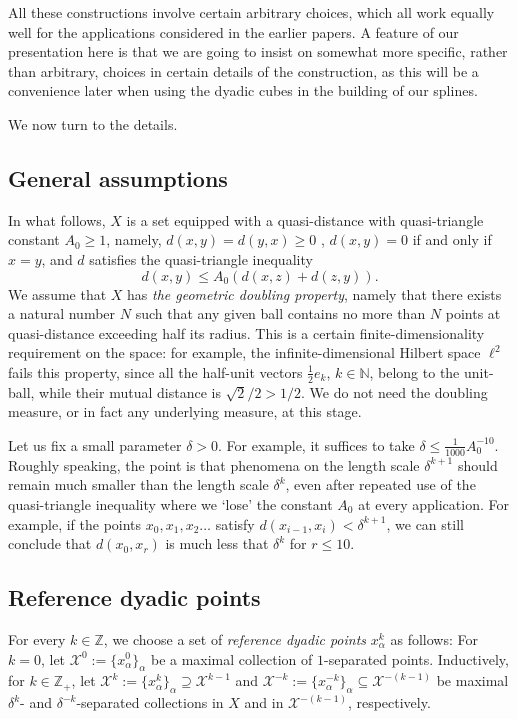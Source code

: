 \documentclass{amsart}
\numberwithin{equation}{section}
\theoremstyle{plain}
\theoremstyle{definition}
\theoremstyle{remark}
\begin{document}
{{All these constructions involve certain arbitrary choices, which all work equally well for the applications considered in the earlier papers. A feature of our presentation here is that we are going to insist on somewhat more specific, rather than arbitrary, choices in certain details of the construction, as this will be a convenience later when using the dyadic cubes in the building of our splines.

We now turn to the details.

\subsection*{General assumptions}
In what follows, $X$ is a set equipped with a quasi-distance with quasi-triangle constant $A_{0}\geq 1$, namely, $d(x,y)=d(y,x)\ge 0$ , $d(x,y)=0$ if and only if $x=y$, and {$d$ satisfies the} quasi-triangle  inequality
$$
d(x,y) \le A_{0} (d(x,z)+d(z,y)).
$$
We assume that $X$ has \emph{the geometric doubling property}, namely that there exists a natural number $N$ such that  any given ball  contains no more than $N$ points at quasi-distance exceeding half its radius.
This is a certain finite-dimensionality requirement on the space: for example, the infinite-dimensional Hilbert space $\ell^2$ fails this property, since all the half-unit vectors $\tfrac12 e_k$, $k\in{\mathbb{N}}$, belong to the unit-ball, while their mutual distance is $\sqrt{2}/2>1/2$.
We do not need the doubling measure, or in fact any underlying measure, at this stage.

Let us fix a small parameter $\delta>0$. For example, it suffices to take $\delta\leq\frac{1}{1000}A_0^{-10}$.
Roughly speaking, the point is that phenomena on the length scale $\delta^{k+1}$ should remain much smaller than the length scale $\delta^k$, even after repeated use of the quasi-triangle inequality where we `lose' the constant $A_0$ at every application. For example, if the points $x_0,x_1,x_2\ldots$ satisfy $d(x_{i-1},x_i)<\delta^{k+1}$, we can still conclude that $d(x_0,x_r)$ is much less that $\delta^k$ for $r\leq 10$.

\subsection*{Reference dyadic points}
For every $k\in{\mathbb{Z}}$, we choose a set of \emph{reference dyadic points} $x^k_{\alpha}$ as follows: For $k=0$, let $\mathscr{X}^0:=\{x^0_{\alpha}\}_{\alpha}$ be a maximal collection of $1$-separated points. Inductively, for $k\in{\mathbb{Z}}_+$, let $\mathscr{X}^k:=\{x^{k}_{\alpha}\}_{\alpha}\supseteq\mathscr{X}^{k-1}$ and $\mathscr{X}^{-k}:=\{x^{-k}_{\alpha}\}_{\alpha}\subseteq\mathscr{X}^{-(k-1)}$ be maximal $\delta^{k}$- and $\delta^{-k}$-separated collections in $X$ and in $\mathscr{X}^{-(k-1)}$, respectively.

}}
\end{document}
